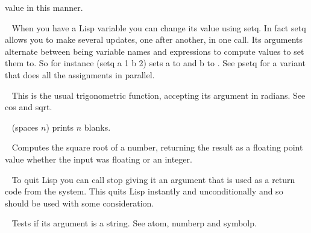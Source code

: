 \begin{description}
value in this manner.
\item[{\tx setq~~~~~~~~~} \hspace{1cm} {\em special form}]~\newline
When you have a Lisp variable you can change its value using {\tx setq}. In
fact {\tx setq} allows you to make several updates, one after another, in one
call. Its arguments alternate between being variable names and expressions
to compute values to set them to. So for instance {\tx (setq a 1 b 2)} sets
{\tx a} to {} and {\tx b} to {}. See {\tx psetq} for a variant that
does all the assignments in parallel.
\item[{\tx sin~~~~~~~~~~} \hspace{1cm} {\em function 1 arg}]~\newline
This is the usual trigonometric function, accepting its argument in
radians. See {\tx cos} and {\tx sqrt}.
\item[{\tx spaces~~~~~~~} \hspace{1cm} {\em function 1 arg}]~\newline
{\tx (spaces $n$)} prints $n$ blanks.
\item[{\tx sqrt~~~~~~~~~} \hspace{1cm} {\em function 1 arg}]~\newline
Computes the square root of a number, returning the result as a floating
point value whether the input was floating or an integer.
\item[{\tx stop~~~~~~~~~} \hspace{1cm} {\em function 1 arg}]~\newline
To quit Lisp you can call {\tx stop} giving it an argument that is used as
a return code from the system. This quits Lisp instantly and unconditionally
and so should be used with some consideration.
\item[{\tx stringp~~~~~~} \hspace{1cm} {\em function 1 arg}]~\newline
Tests if its argument is a string. See {\tx atom}, {\tx numberp} and
{\tx symbolp}.
\item[{\tx sub1~~~~~~~~~} \hspace{1cm} {\em function 1 arg}]~\newline

\end{description}
